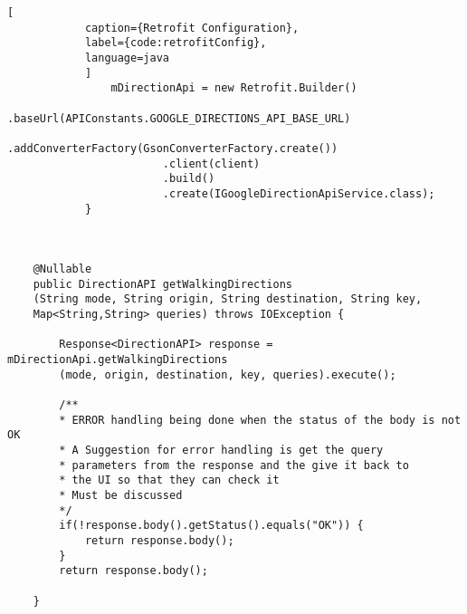 \begin{lstlisting}[
            caption={Retrofit Configuration},
            label={code:retrofitConfig},
            language=java
            ]
                mDirectionApi = new Retrofit.Builder()
                        .baseUrl(APIConstants.GOOGLE_DIRECTIONS_API_BASE_URL)
                        .addConverterFactory(GsonConverterFactory.create())
                        .client(client)
                        .build()
                        .create(IGoogleDirectionApiService.class);
            }


            
    @Nullable
    public DirectionAPI getWalkingDirections
    (String mode, String origin, String destination, String key, 
    Map<String,String> queries) throws IOException {
       
        Response<DirectionAPI> response = mDirectionApi.getWalkingDirections
        (mode, origin, destination, key, queries).execute();

        /**
        * ERROR handling being done when the status of the body is not OK
        * A Suggestion for error handling is get the query 
        * parameters from the response and the give it back to 
        * the UI so that they can check it
        * Must be discussed
        */
        if(!response.body().getStatus().equals("OK")) {
            return response.body();
        }
        return response.body();
        
    }

        \end{lstlisting}